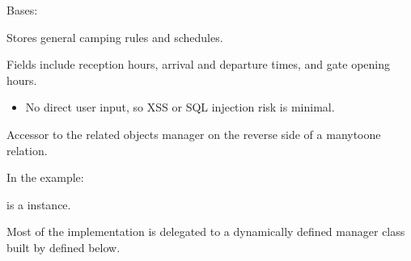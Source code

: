 \documentclass[letterpaper,10pt,english]{sphinxmanual}
\begin{document}
\begin{fulllineitems}
\label{\detokenize{index:core.models.CampingInfo}}
\pysigstartsignatures
\pysiglinewithargsret
{}
{\sphinxparamcomma {}}
{}
\pysigstopsignatures
\sphinxAtStartPar
Bases: 

\sphinxAtStartPar
Stores general camping rules and schedules.

\sphinxAtStartPar
Fields include reception hours, arrival and departure times, and gate opening hours.
\begin{description}
\begin{itemize}
\item {} 
\sphinxAtStartPar
No direct user input, so XSS or SQL injection risk is minimal.

\end{itemize}

\end{description}

\begin{fulllineitems}
\label{\detokenize{index:core.models.CampingInfo.translations}}
\pysigstartsignatures
\pysigline
{}
\pysigstopsignatures
\sphinxAtStartPar
Accessor to the related objects manager on the reverse side of a
many\sphinxhyphen{}to\sphinxhyphen{}one relation.

\sphinxAtStartPar
In the example:

\begin{sphinxVerbatim}[commandchars=\\\{\}]
       
\end{sphinxVerbatim}

\sphinxAtStartPar
{} is a  instance.

\sphinxAtStartPar
Most of the implementation is delegated to a dynamically defined manager
class built by  defined below.


\end{fulllineitems}
\end{fulllineitems}
\end{document}
